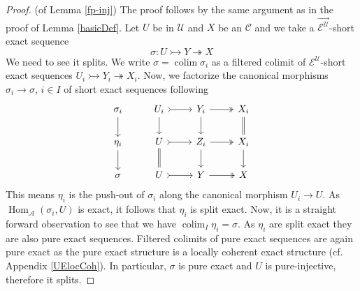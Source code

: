 \documentclass[11pt,a4paper]{amsart}
\theoremstyle{plain}
\theoremstyle{definition}
\DeclareMathOperator{\Hom}{Hom}
\DeclareMathOperator*{\colim}{colim}
\newcommand{\defl}{\twoheadrightarrow}
\newcommand{\infl}{\rightarrowtail}
\newcommand{\mcA}{\mathcal{A}}
\newcommand{\mcC}{\mathcal{C}}
\newcommand{\mcE}{\mathcal{E}}
\newcommand{\mcU}{\mathcal{U}}
\begin{document}
\begin{proof} (of Lemma \ref{fp-inj}) The proof follows by the same argument as in the proof of Lemma \ref{basicDef}. Let $U$ be in $\mcU$ and $X$ be an $\mcC$ and we take a $\overrightarrow{\mcE^{\mcU}}$-short exact sequence 
\[
\sigma \colon U \infl Y \defl X
\]
We need to see it splits. We write $\sigma=\colim \sigma_i$ as a filtered colimit of $\mcE^{\mcU}$-short exact sequences $U_i \infl Y_i \defl X_i$. Now, we factorize the canonical morphisms $\sigma_i \to \sigma$, $i \in I$ of short exact sequences following \cite[Prop. 3.1]{Bue}
\[
\begin{tikzcd}
\sigma_i  \arrow[d] & U_i \arrow[r, tail] \arrow[d] & Y_i \arrow[r, two heads] \arrow[d] & X_i \arrow[d,-,double equal sign distance,double] \\
\eta_i \arrow[d]    & U \arrow[r, tail] \arrow[d,-,double equal sign distance,double]   & Z_i \arrow[r, two heads] \arrow[d] & X_i \arrow[d] \\
\sigma              & U \arrow[r, tail]             & Y \arrow[r, two heads]             & X            
\end{tikzcd}
\]
This means $\eta_i$ is the push-out of $\sigma_i$ along the canonical morphism $U_i \to U$. As $\Hom_{\mcA} (\sigma_i, U)$ is exact, it follows that $\eta_i$ is split exact. Now, it is a straight forward observation to see that we have $\colim_I \eta_i =\sigma$. As $\eta_i$ are split exact they are also pure exact sequences. Filtered colimits of pure exact sequences are again pure exact as the pure exact structure is a locally coherent exact structure (cf. Appendix \ref{UElocCoh}). In particular, $\sigma$ is pure exact and $U$ is pure-injective, therefore it splits.   
\end{proof}
\end{document}
